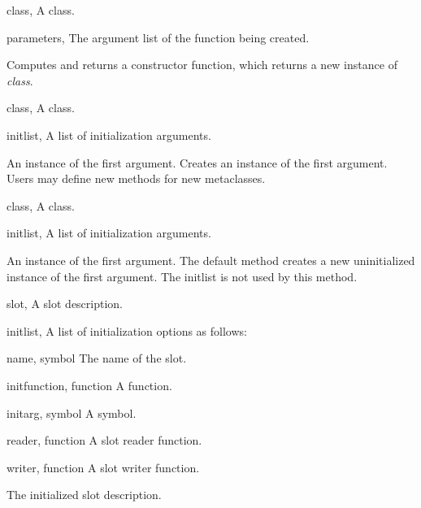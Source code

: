 \begin{optDefinition}
%
\begin{specargs}
    \item[class, \classref{class}] A class.
    \item[parameters, \classref{list}] The argument list of the function being
    created.
\end{specargs}
%
\result%
Computes and returns a constructor function, which returns a new
instance of {\em class}.

%
\begin{genericargs}
    \item[class, \classref{class}] A class.
    \item[initlist, \classref{list}] A list of initialization arguments.
\end{genericargs}
%
\result%
An instance of the first argument.
%
\remarks%
Creates an instance of the first argument.  Users may define new
methods for new metaclasses.

%
\begin{specargs}
    \item[class, \classref{class}] A class.
    \item[initlist, \classref{list}] A list of initialization arguments.
\end{specargs}
%
\result%
An instance of the first argument.
%
\remarks%
The default method creates a new uninitialized instance of the first
argument.  The initlist is not used by this  method.
%
\end{optDefinition}

%
\begin{optDefinition}
%
%
\begin{specargs}
    \item[slot, \classref{slot}] A slot description.
    \item[initlist, \classref{list}] A list of initialization options as
    follows:
    \begin{options}
        \item[name, symbol] The name of the slot.
        \item[initfunction, function] A function.
        \item[initarg, symbol] A symbol.
        \item[reader, function] A slot reader function.
        \item[writer, function] A slot writer function.
    \end{options}
\end{specargs}
%
\result%
The initialized slot description.
%
\end{optDefinition}

